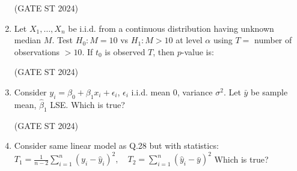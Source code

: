 \documentclass[journal,12pt,onecolumn]{IEEEtran}
\theoremstyle{remark}
\begin{document}
\begin{enumerate}
\begin{enumerate}
\end{enumerate}
\hfill (GATE ST 2024)
\item
Let $X_1,\dots,X_n$ be i.i.d. from a continuous distribution having unknown median $M$. Test $H_0: M=10$ vs $H_1: M>10$ at level $\alpha$ using $T =$ number of observations $>10$. If $t_0$ is observed $T$, then $p$-value is:

\begin{enumerate}
\end{enumerate}
\hfill (GATE ST 2024)
\item
Consider $y_i = \beta_0 + \beta_1 x_i + \epsilon_i$, $\epsilon_i$ i.i.d. mean 0, variance $\sigma^2$. Let $\bar{y}$ be sample mean, $\hat{\beta}_1$ LSE. Which is true?

\begin{enumerate}
\end{enumerate}
\hfill (GATE ST 2024)
\item
Consider same linear model as Q.28 but with statistics:
$
T_1 = \frac{1}{n-2}\sum_{i=1}^n (y_i - \hat{y}_i)^2,\quad
T_2 = \sum_{i=1}^n (\hat{y}_i - \bar{y})^2
$
Which is true?


\end{enumerate}
\end{document}
